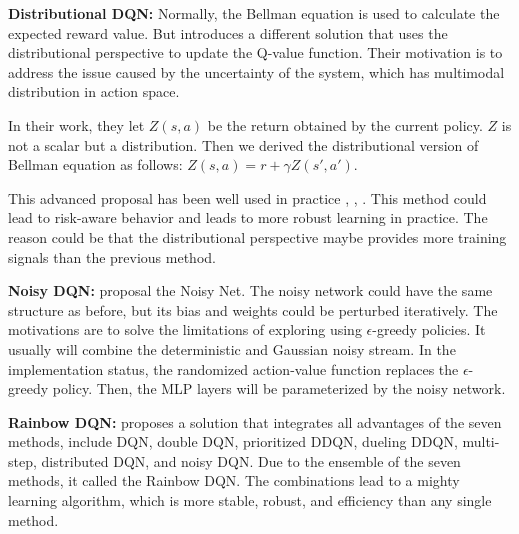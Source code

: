 \documentclass{article}
\begin{document}
{\bf Distributional DQN:}
Normally, the Bellman equation is used to calculate the expected reward value. But \citep{bellemare2017distributional} introduces a different solution that uses the distributional perspective to update the Q-value function. Their motivation is to address the issue caused by the uncertainty of the system, which has multimodal distribution in action space.

In their work, they let  ${Z}(s,a)$ be the return obtained by the current policy. ${Z}$ is not a scalar but a distribution. Then we derived the distributional version of Bellman equation as follows: ${Z}(s,a) = r + \gamma {Z}(s',a')$. 

This advanced proposal has been well used in practice \citep{bellemare2017distributional}, \citep{dabney2018distributional},  \citep{rowland2018analysis}. This method could lead to risk-aware behavior \citep{morimura2010nonparametric} and leads to more robust learning in practice. The reason could be that the distributional perspective maybe provides more training signals than the previous method.

{\bf Noisy DQN:}
\citep{fortunato2017noisy} proposal the Noisy Net. The noisy network could have the same structure as before, but its bias and weights could be perturbed iteratively. The motivations are to solve the limitations of exploring using $\epsilon$-greedy policies. It usually will combine the deterministic and Gaussian noisy stream.
In the implementation status, the randomized action-value function replaces the $\epsilon$-greedy policy. Then, the MLP layers will be parameterized by the noisy network. 

{\bf Rainbow DQN:}
\citep{matteo2017rainbow} proposes a solution that integrates all advantages of the seven methods, include DQN, double DQN, prioritized DDQN, dueling DDQN, multi-step, distributed DQN, and noisy DQN. Due to the ensemble of the seven methods, it called the Rainbow DQN.  The combinations lead to a mighty learning algorithm, which is more stable, robust, and efficiency than any single method.
%
\end{document}
